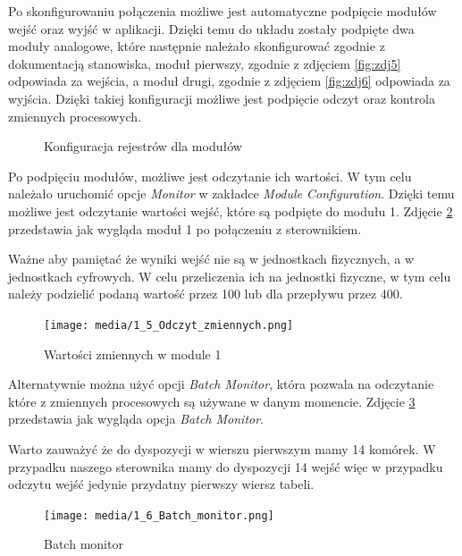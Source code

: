 \documentclass{article}
\begin{document}
\newpage
Po skonfigurowaniu połączenia możliwe jest automatyczne podpięcie modułów wejść oraz wyjść w aplikacji. Dzięki temu do układu zostały podpięte dwa moduły analogowe, które następnie należało skonfigurować zgodnie z dokumentacją stanowiska, moduł pierwszy, zgodnie z zdjęciem \ref{fig:zdj5} odpowiada za wejścia, a moduł drugi, zgodnie z zdjęciem \ref{fig:zdj6} odpowiada za wyjścia. Dzięki takiej konfiguracji możliwe jest podpięcie odczyt oraz kontrola zmiennych procesowych. 

\begin{figure}[H]
    \centering
    \caption{Konfiguracja rejestrów dla modułów}
    \label{fig:main1}
\end{figure}

Po podpięciu modułów, możliwe jest odczytanie ich wartości. W tym celu należało uruchomić opcje \textit{Monitor}  w zakładce \textit{Module Configuration}. Dzięki temu możliwe jest odczytanie wartości wejść, które są podpięte do modułu 1. Zdjęcie \ref{fig:zdj7} przedstawia jak wygląda moduł 1 po połączeniu z sterownikiem.

Ważne aby pamiętać że wyniki wejść nie są w jednostkach fizycznych, a w jednostkach cyfrowych. W celu przeliczenia ich na jednostki fizyczne, w tym celu należy podzielić podaną wartość przez 100 lub dla przepływu przez 400.


\begin{figure}[H]
    \centering
    \texttt{[image: media/1\_5\_Odczyt\_zmiennych.png]}
    \caption{Wartości zmiennych w module 1}
    \label{fig:zdj7}
\end{figure}

\newpage
Alternatywnie można użyć opcji \textit{Batch Monitor}, która pozwala na odczytanie które z zmiennych procesowych są używane w danym momencie. Zdjęcie \ref{fig:zdj8} przedstawia jak wygląda opcja \textit{Batch Monitor}. 

Warto zauważyć że do dyspozycji w wierszu pierwszym mamy 14 komórek. W przypadku naszego sterownika mamy do dyspozycji 14 wejść więc w przypadku odczytu wejść jedynie przydatny pierwszy wiersz tabeli.
\begin{figure}[H]
    \centering
    \texttt{[image: media/1\_6\_Batch\_monitor.png]}
    \caption{Batch monitor}
    \label{fig:zdj8}
\end{figure}
\end{document}
